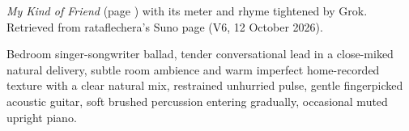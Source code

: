
\begin{notes}
\emph{My Kind of Friend} (page \pageref{sec:my-kind-of-friend}) with its meter and rhyme tightened by Grok. Retrieved from rataflechera's Suno page (V6, 12 October 2026).
\end{notes}
\begin{style}
Bedroom singer-songwriter ballad, tender conversational lead in a close-miked natural delivery, subtle room ambience and warm imperfect home-recorded texture with a clear natural mix, restrained unhurried pulse, gentle fingerpicked acoustic guitar, soft brushed percussion entering gradually, occasional muted upright piano.
\end{style}
